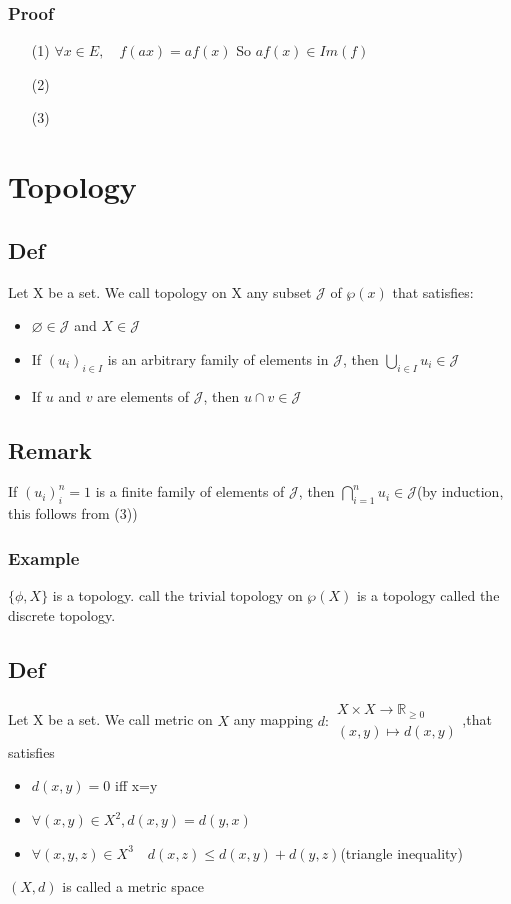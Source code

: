 \documentclass{book}
\begin{document}
\subsection*{Proof}
\begin{itemize}
    \item[(1)] $\forall x\in E,\quad f(ax)=af(x)$ So $ af(x)\in Im(f)$
    \item [(2)]
    \item [(3)]
\end{itemize}
\chapter{Topology}
\section{Def}
Let X be a set. We call topology on X any subset $\mathcal{J} $ of $\wp (x)$ that satisfies:\begin{itemize}
    \item $\varnothing\in \mathcal{J} $ and $X\in \mathcal{J} $
    \item If $(u_i)_{i\in I}$ is an arbitrary family of elements in $\mathcal{J} $, then $\bigcup\limits_{i\in I}u_i\in \mathcal{J} $
    \item If $u$ and $v$ are elements of $\mathcal{J} $, then $u\cap v\in \mathcal{J} $
\end{itemize}
\section{Remark}
If $(u_i)^n_i=1$ is a finite family of elements of $\mathcal{J} $, then $\bigcap\limits_{i=1}^{n}u_i\in \mathcal{J}$(by induction, this follows from (3))
\subsection{Example}
$\{\phi,X\}$ is a topology. call the trivial topology on $\wp (X)$ is a topology called the discrete topology.
\section{Def}
Let X be a set. We call metric on $X$ any mapping $d:\begin{aligned}
    X\times X\rightarrow\mathbb{R} _{\geq 0}\\(x,y)\mapsto d(x,y)
\end{aligned}$,that satisfies\begin{itemize}
    \item $d(x,y)=0$ iff x=y
    \item $\forall(x,y)\in X^2, d(x,y)=d(y,x)$
    \item $\forall(x,y,z)\in X^3\quad d(x,z)\leq d(x,y)+d(y,z)$(triangle inequality)
\end{itemize}
$(X,d)$ is called a metric space
\end{document}
